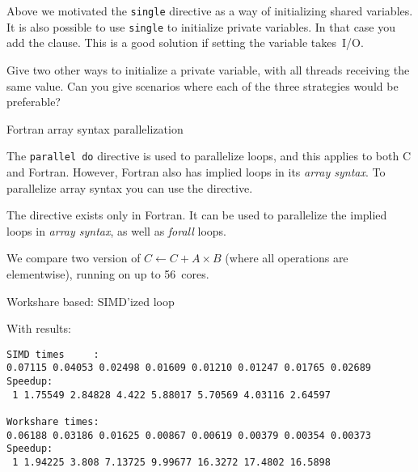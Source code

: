 Above we motivated the \lstinline{single} directive as a way of initializing
shared variables. It is also possible to use \lstinline{single} to initialize
private variables. In that case you add the 
clause. This is a good solution if setting the variable takes~I/O.

\begin{exercise}
  Give two other ways to initialize a private variable, with all
  threads receiving the same value. Can you give scenarios where each
  of the three strategies would be preferable?
\end{exercise}

 {Fortran array syntax parallelization}
\label{sec:fortran-workshare}

The \lstinline{parallel do} directive is used to parallelize loops,
and this applies to both C and Fortran. However, Fortran also
has implied loops in its \emph{array syntax}.
To parallelize array syntax you can use the 
directive.

The  directive exists only in Fortran.
It can be used to parallelize
the implied loops in \emph{array syntax},
as well as  \emph{forall} loops.

We compare two version of $C\leftarrow C+A\times B$
(where all operations are elementwise),
running on 
up to 56~cores.

\begin{multicols}{2}
  Workshare based:
  \columnbreak
  SIMD'ized loop
\end{multicols}

With results:

\begin{verbatim}
SIMD times     :
0.07115 0.04053 0.02498 0.01609 0.01210 0.01247 0.01765 0.02689
Speedup:
 1 1.75549 2.84828 4.422 5.88017 5.70569 4.03116 2.64597

Workshare times:
0.06188 0.03186 0.01625 0.00867 0.00619 0.00379 0.00354 0.00373
Speedup:
 1 1.94225 3.808 7.13725 9.99677 16.3272 17.4802 16.5898  
\end{verbatim}

